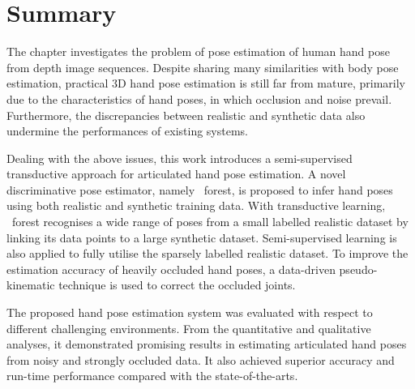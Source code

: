 \section{Summary}

The chapter investigates the problem of pose estimation of human hand pose from depth image sequences. 
Despite sharing many similarities with body pose estimation, practical 3D hand pose estimation is still far from mature, primarily due to the characteristics of hand poses, in which occlusion and noise prevail. 
Furthermore, the discrepancies between realistic and synthetic data also undermine the performances of existing systems. 

Dealing with the above issues, this work introduces a semi-supervised transductive approach for articulated hand pose estimation. A novel discriminative pose estimator, namely \STR\ forest, is proposed to infer hand poses using both realistic and synthetic training data. 
With transductive learning, \STR\ forest recognises a wide range of poses from a small labelled realistic dataset by linking its data points to a large synthetic dataset.
Semi-supervised learning is also applied to fully utilise the sparsely labelled realistic dataset. 
To improve the estimation accuracy of heavily occluded hand poses, a data-driven pseudo-kinematic technique is used to correct the occluded joints.  

The proposed hand pose estimation system was evaluated with respect to different challenging environments. From the quantitative and qualitative analyses, it demonstrated promising results in estimating articulated hand poses from noisy and strongly occluded data.  
It also achieved superior accuracy and run-time performance compared with the state-of-the-arts.  
